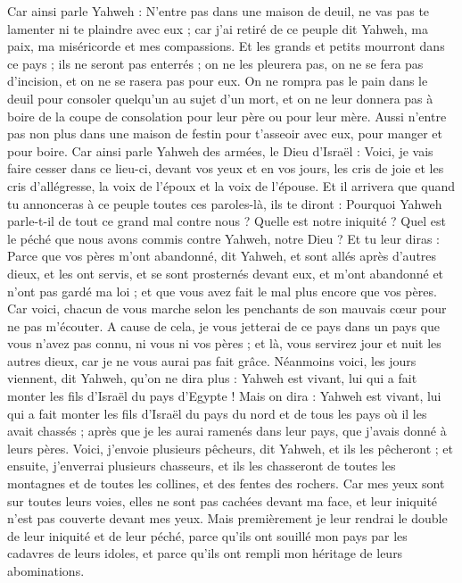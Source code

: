 \begin{multicols}{2}
Car ainsi parle Yahweh : N'entre pas dans une maison de deuil, ne vas pas te lamenter ni te plaindre avec eux ; car j'ai retiré de ce peuple dit Yahweh, ma paix, ma miséricorde et mes compassions.
Et les grands et petits mourront dans ce pays ; ils ne seront pas enterrés ; on ne les pleurera pas, on ne se fera pas d'incision, et on ne se rasera pas pour eux.
On ne rompra pas le pain dans le deuil pour consoler quelqu'un au sujet d'un mort, et on ne leur donnera pas à boire de la coupe de consolation pour leur père ou pour leur mère.
Aussi n'entre pas non plus dans une maison de festin pour t'asseoir avec eux, pour manger et pour boire.
Car ainsi parle Yahweh des armées, le Dieu d'Israël : Voici, je vais faire cesser dans ce lieu-ci, devant vos yeux et en vos jours, les cris de joie et les cris d'allégresse, la voix de l'époux et la voix de l'épouse.
Et il arrivera que quand tu annonceras à ce peuple toutes ces paroles-là, ils te diront : Pourquoi Yahweh parle-t-il de tout ce grand mal contre nous ? Quelle est notre iniquité ? Quel est le péché que nous avons commis contre Yahweh, notre Dieu ?
Et tu leur diras : Parce que vos pères m'ont abandonné, dit Yahweh, et sont allés après d'autres dieux, et les ont servis, et se sont prosternés devant eux, et m'ont abandonné et n'ont pas gardé ma loi ; 
et que vous avez fait le mal plus encore que vos pères. Car voici, chacun de vous marche selon les penchants de son mauvais cœur pour ne pas m'écouter.
A cause de cela, je vous jetterai de ce pays dans un pays que vous n'avez pas connu, ni vous ni vos pères ; et là, vous servirez jour et nuit les autres dieux, car je ne vous aurai pas fait grâce.
Néanmoins voici, les jours viennent, dit Yahweh, qu'on ne dira plus : Yahweh est vivant, lui qui a fait monter les fils d'Israël du pays d'Egypte !
Mais on dira : Yahweh est vivant, lui qui a fait monter les fils d'Israël du pays du nord et de tous les pays où il les avait chassés ; après que je les aurai ramenés dans leur pays, que j'avais donné à leurs pères.
Voici, j'envoie plusieurs pêcheurs, dit Yahweh, et ils les pêcheront ; et ensuite, j'enverrai plusieurs chasseurs, et ils les chasseront de toutes les montagnes et de toutes les collines, et des fentes des rochers.
Car mes yeux sont sur toutes leurs voies, elles ne sont pas cachées devant ma face, et leur iniquité n'est pas couverte devant mes yeux.
Mais premièrement je leur rendrai le double de leur iniquité et de leur péché, parce qu'ils ont souillé mon pays par les cadavres de leurs idoles, et parce qu'ils ont rempli mon héritage de leurs abominations.

\end{multicols}
